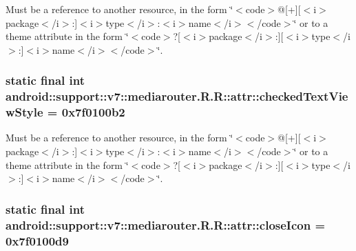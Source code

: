 Must be a reference to another resource, in the form \char`\"{}$<$code$>$@\mbox{[}+\mbox{]}\mbox{[}$<$i$>$package$<$/i$>$:\mbox{]}$<$i$>$type$<$/i$>$:$<$i$>$name$<$/i$>$$<$/code$>$\char`\"{} or to a theme attribute in the form \char`\"{}$<$code$>$?\mbox{[}$<$i$>$package$<$/i$>$:\mbox{]}\mbox{[}$<$i$>$type$<$/i$>$:\mbox{]}$<$i$>$name$<$/i$>$$<$/code$>$\char`\"{}. \hypertarget{classandroid_1_1support_1_1v7_1_1mediarouter_1_1_r_1_1attr_b68505f886322ae774a16cf0768017d8}{
\subsubsection[{checkedTextViewStyle}]{\setlength{\rightskip}{0pt plus 5cm}static final int android::support::v7::mediarouter.R.R::attr::checkedTextViewStyle = 0x7f0100b2}}
\label{classandroid_1_1support_1_1v7_1_1mediarouter_1_1_r_1_1attr_b68505f886322ae774a16cf0768017d8}


Must be a reference to another resource, in the form \char`\"{}$<$code$>$@\mbox{[}+\mbox{]}\mbox{[}$<$i$>$package$<$/i$>$:\mbox{]}$<$i$>$type$<$/i$>$:$<$i$>$name$<$/i$>$$<$/code$>$\char`\"{} or to a theme attribute in the form \char`\"{}$<$code$>$?\mbox{[}$<$i$>$package$<$/i$>$:\mbox{]}\mbox{[}$<$i$>$type$<$/i$>$:\mbox{]}$<$i$>$name$<$/i$>$$<$/code$>$\char`\"{}. \hypertarget{classandroid_1_1support_1_1v7_1_1mediarouter_1_1_r_1_1attr_d6462a3eff792f3b99ba6e401c12d218}{
\subsubsection[{closeIcon}]{\setlength{\rightskip}{0pt plus 5cm}static final int android::support::v7::mediarouter.R.R::attr::closeIcon = 0x7f0100d9}}
\label{classandroid_1_1support_1_1v7_1_1mediarouter_1_1_r_1_1attr_d6462a3eff792f3b99ba6e401c12d218}


